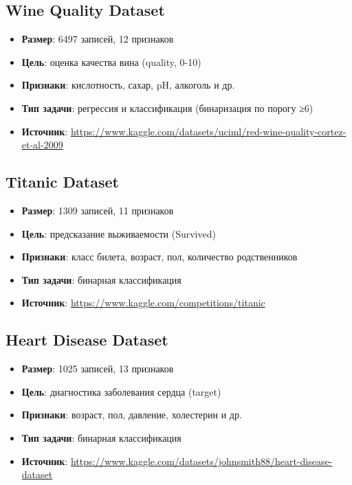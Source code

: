 \documentclass[a4paper]{article}
\begin{document}
\subsection{Wine Quality Dataset}
\begin{itemize}
    \item \textbf{Размер}: 6497 записей, 12 признаков
    \item \textbf{Цель}: оценка качества вина (quality, 0-10)
    \item \textbf{Признаки}: кислотность, сахар, pH, алкоголь и др.
    \item \textbf{Тип задачи}: регрессия и классификация (бинаризация по порогу ≥6)
    \item \textbf{Источник}: \url{https://www.kaggle.com/datasets/uciml/red-wine-quality-cortez-et-al-2009}
\end{itemize}

\subsection{Titanic Dataset}
\begin{itemize}
    \item \textbf{Размер}: 1309 записей, 11 признаков
    \item \textbf{Цель}: предсказание выживаемости (Survived)
    \item \textbf{Признаки}: класс билета, возраст, пол, количество родственников
    \item \textbf{Тип задачи}: бинарная классификация
    \item \textbf{Источник}: \url{https://www.kaggle.com/competitions/titanic}
\end{itemize}

\subsection{Heart Disease Dataset}
\begin{itemize}
    \item \textbf{Размер}: 1025 записей, 13 признаков
    \item \textbf{Цель}: диагностика заболевания сердца (target)
    \item \textbf{Признаки}: возраст, пол, давление, холестерин и др.
    \item \textbf{Тип задачи}: бинарная классификация
    \item \textbf{Источник}: \url{https://www.kaggle.com/datasets/johnsmith88/heart-disease-dataset}
\end{itemize}
\end{document}
